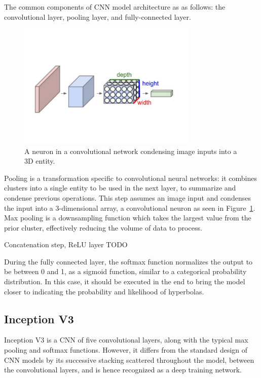 \documentclass[se,blockletter]{uw-wkrpt}
\begin{document}
The common components of CNN model architecture as as follows: the convolutional layer, pooling layer, and fully-connected layer.

\begin{figure}
  \centering
  \includegraphics[height=6cm]{convolutional-neuron}
  \caption{A neuron in a convolutional network condensing image inputs into a 3D entity.~\cite{ref:}}
  \label{fig:cnn-neuron}
\end{figure}

Pooling is a transformation specific to convolutional neural networks: it combines clusters into a single entity to be used in the next layer, to summarize and condense previous operations. This step assumes an image input and condenses the input into a 3-dimensional array, a convolutional neuron as seen in Figure~\ref{fig:cnn-neuron}. Max pooling is a downsampling function which takes the largest value from the prior cluster, effectively reducing the volume of data to process.  

Concatenation step, ReLU layer TODO

During the fully connected layer, the softmax function normalizes the output to be between 0 and 1, as a sigmoid function, similar to a categorical probability distribution. In this case, it should be executed in the end to bring the model closer to indicating the probability and likelihood of hyperbolas. 

\subsection{Inception V3}

Inception V3 is a CNN of five convolutional layers, along with the typical max pooling and softmax functions. However, it differs from the standard design of CNN models by its successive stacking scattered throughout the model, between the convolutional layers, and is hence recognized as a deep training network.
\end{document}
